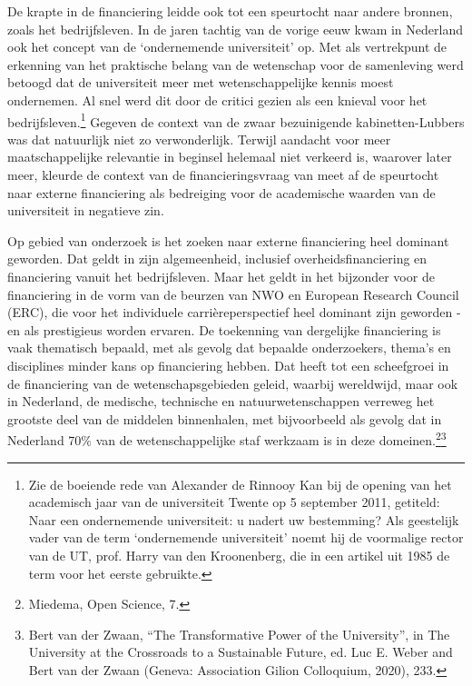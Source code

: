 \documentclass{jote-book}
\begin{document}
	De krapte in de financiering leidde ook tot een speurtocht naar andere bronnen, zoals het bedrijfsleven. In de jaren tachtig van de vorige eeuw kwam in Nederland ook het concept van de ‘ondernemende universiteit' op. Met als vertrekpunt de erkenning van het praktische belang van de wetenschap voor de samenleving werd betoogd dat de universiteit meer met wetenschappelijke kennis moest ondernemen. Al snel werd dit door de critici gezien als een knieval voor het bedrijfsleven.\footnote{Zie de boeiende rede van Alexander de Rinnooy Kan bij de opening van het academisch jaar van de universiteit Twente op 5 september 2011, getiteld: Naar een ondernemende universiteit: u nadert uw bestemming? Als geestelijk vader van de term ‘ondernemende universiteit' noemt hij de voormalige rector van de UT, prof. Harry van den Kroonenberg, die in een artikel uit 1985 de term voor het eerste gebruikte.} Gegeven de context van de zwaar bezuinigende kabinetten-Lubbers was dat natuurlijk niet zo verwonderlijk. Terwijl aandacht voor meer maatschappelijke relevantie in beginsel helemaal niet verkeerd is, waarover later meer, kleurde de context van de financieringsvraag van meet af de speurtocht naar externe financiering als bedreiging voor de academische waarden van de universiteit in negatieve zin.



	Op gebied van onderzoek is het zoeken naar externe financiering heel dominant geworden. Dat geldt in zijn algemeenheid, inclusief overheidsfinanciering en financiering vanuit het bedrijfsleven. Maar het geldt in het bijzonder voor de financiering in de vorm van de beurzen van NWO en European Research Council (ERC), die voor het individuele carrièreperspectief heel dominant zijn geworden - en als prestigieus worden ervaren. De toekenning van dergelijke financiering is vaak thematisch bepaald, met als gevolg dat bepaalde onderzoekers, thema's en disciplines minder kans op financiering hebben. Dat heeft tot een scheefgroei in de financiering van de wetenschapsgebieden geleid, waarbij wereldwijd, maar ook in Nederland, de medische, technische en natuurwetenschappen verreweg het grootste deel van de middelen binnenhalen, met bijvoorbeeld als gevolg dat in Nederland 70\% van de wetenschappelijke staf werkzaam is in deze domeinen.\footnote{Miedema, Open Science, 7.}\textsuperscript{\fbox{,}}\footnote{Bert van der Zwaan, “The Transformative Power of the University”, in The University at the Crossroads to a Sustainable Future, ed. Luc E. Weber and Bert van der Zwaan (Geneva: Association Gilion Colloquium, 2020), 233.}
\end{document}
